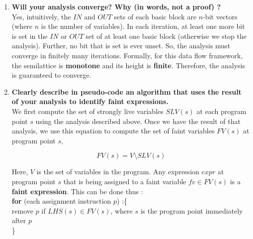 \begin{enumerate}
\item \textbf{Will your analysis converge? Why (in words, not a proof) ?} \\

  Yes, intuitively, the $IN$ and $OUT$ sets of each basic block are $n$-bit vectors (where $n$ is the number of variables).
  In each iteration, at least one more bit is set in the $IN$ or $OUT$ set of at least one basic block (otherwise we stop the analysis).
  Further, no bit that is set is ever unset.
  So, the analysis must converge in finitely many iterations.
  Formally, for this data flow framework, the semilattice is \textbf{monotone} and its height is \textbf{finite}.
  Therefore, the analysis is guaranteed to converge.

\item \textbf{Clearly describe in pseudo-code an algorithm that uses the result of your analysis to identify faint expressions.} \\

  We first compute the set of strongly live variables $SLV(s)$ at each program point $s$ using the analysis described above.
  Once we have the result of that analysis,
  we use this equation to compute the set of faint variables $FV(s)$ at program point $s$,

  $$FV(s) = V \setminus SLV(s)$$

  Here, $V$ is the set of variables in the program. Any expression $expr$ at program point $s$ that is being
  assigned to a faint variable $fv \in FV(s)$ is a \textbf{faint expression}. This can be done thus :\\
  
  \textbf{for} (each assignment instruction $p$) :\{\\
  remove $p$ if $LHS(s) \in FV(s)$, where $s$ is the program point immediately after $p$\\  
  \}\\

\end{enumerate}
